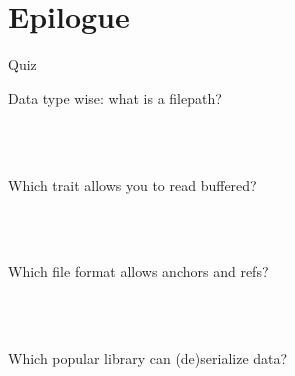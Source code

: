 \documentclass{beamer}
\begin{document}


\section{Epilogue}

\begin{frame}[fragile]{Quiz}
  \begin{description}
    \item[Data type wise: what is a filepath?] \hfill{} \\
      ~
    \item[Which trait allows you to read buffered?] \hfill{} \\
      ~
    \item[Which file format allows anchors and refs?] \hfill{} \\
      ~
    \item[Which popular library can (de)serialize data?] \hfill{} \\
      ~
  \end{description}
\end{frame}
\end{document}
